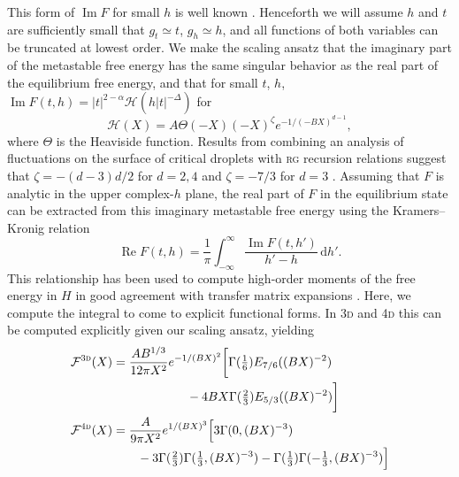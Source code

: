 \documentclass[aps,prl,reprint]{revtex4-1}
\def\[{\begin{equation}}
\def\]{\end{equation}}
\def\re{\mathop{\mathrm{Re}}\nolimits}
\def\im{\mathop{\mathrm{Im}}\nolimits}
\def\dd{\mathrm d}
\newif\ifreprint
\begin{document}
This form of $\im F$ for small $h$ is well known
\cite{langer.1967.condensation,harris.1984.metastability}. Henceforth we will
assume $h$ and $t$ are sufficiently small that $g_t\simeq t$, $g_h\simeq h$,
and all functions of both variables can be truncated at lowest order. We make
the scaling ansatz that the imaginary part of the metastable free energy has
the same singular behavior as the real part of the equilibrium free energy,
and that for small $t$, $h$, $\im F(t,h)=|t|^{2-\alpha}\mathcal
H(h|t|^{-\Delta})$ for
\[
  \mathcal H(X)=A\Theta(-X)(-X)^\zeta e^{-1/(-BX)^{d-1}},
  \label{eq:im.scaling}
\]
where $\Theta$ is the Heaviside function. Results from combining an analysis
of fluctuations on the surface of critical droplets with \textsc{rg} recursion
relations suggest that $\zeta=-(d-3)d/2$ for $d=2,4$ and $\zeta=-7/3$ for
$d=3$
\cite{houghton.1980.metastable,rudnick.1976.equations,gunther.1980.goldstone}.
Assuming that $F$ is analytic in the upper complex-$h$ plane, the real part of
$F$ in the equilibrium state can be extracted from this imaginary metastable
free energy using the Kramers--Kronig relation
\[
  \re F(t,h)=\frac1\pi\int_{-\infty}^\infty\frac{\im F(t,h')}{h'-h}\,\dd h'.
\]
This relationship has been used to compute high-order moments of the free
energy in $H$ in good agreement with transfer matrix expansions
\cite{lowe.1980.instantons}. Here, we compute the integral to come to explicit
functional forms.  In \textsc{3d} and \textsc{4d} this can be computed
explicitly given our scaling ansatz, yielding
\def\eqthreedeeone{
  \mathcal F^{\text{\textsc{3d}}}(X)&=
  \frac{AB^{1/3}}{12\pi X^2}e^{-1/(BX)^2}
  \bigg[\Gamma(\tfrac16)E_{7/6}((BX)^{-2})
}
\def\eqthreedeetwo{
  -4BX\Gamma(\tfrac23)E_{5/3}((BX)^{-2})\bigg]
}
\def\eqfourdeeone{
  \mathcal F^{\text{\textsc{4d}}}(X)&=
  \frac{A}{9\pi X^2}e^{1/(BX)^3}
  \Big[3\Gamma(0,(BX)^{-3})
}
\def\eqfourdeetwo{
  -3\Gamma(\tfrac23)\Gamma(\tfrac13,(BX)^{-3})
  -\Gamma(\tfrac13)\Gamma(-\tfrac13,(BX)^{-3})\Big]
}
\ifreprint
\begin{align}
  &\begin{aligned}
    \eqthreedeeone\\
    &\hspace{6em}
    \eqthreedeetwo
  \end{aligned}
  \\
  &\begin{aligned}
    \eqfourdeeone
    \\
    &\hspace{2em}
    \eqfourdeetwo
  \end{aligned}
\end{align}
\end{document}
